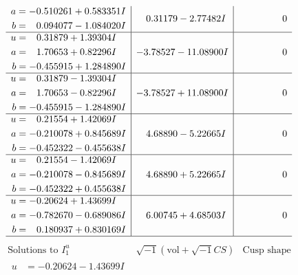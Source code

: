 \documentclass[1p]{elsarticle_modified}
\theoremstyle{definition}
\newcommand{\I}{\sqrt{-1}}
\begin{document}
$$\begin{array}{c|c|c}
\begin{aligned}
a &= -0.510261 + 0.583351 I \\
b &= \phantom{-}0.094077 - 1.084020 I\end{aligned}
 & \phantom{-}0.31179 - 2.77482 I & \phantom{-0.000000 } 0 \\ \hline\begin{aligned}
u &= \phantom{-}0.31879 + 1.39304 I \\
a &= \phantom{-}1.70653 + 0.82296 I \\
b &= -0.455915 + 1.284890 I\end{aligned}
 & -3.78527 - 11.08900 I & \phantom{-0.000000 } 0 \\ \hline\begin{aligned}
u &= \phantom{-}0.31879 - 1.39304 I \\
a &= \phantom{-}1.70653 - 0.82296 I \\
b &= -0.455915 - 1.284890 I\end{aligned}
 & -3.78527 + 11.08900 I & \phantom{-0.000000 } 0 \\ \hline\begin{aligned}
u &= \phantom{-}0.21554 + 1.42069 I \\
a &= -0.210078 + 0.845689 I \\
b &= -0.452322 - 0.455638 I\end{aligned}
 & \phantom{-}4.68890 - 5.22665 I & \phantom{-0.000000 } 0 \\ \hline\begin{aligned}
u &= \phantom{-}0.21554 - 1.42069 I \\
a &= -0.210078 - 0.845689 I \\
b &= -0.452322 + 0.455638 I\end{aligned}
 & \phantom{-}4.68890 + 5.22665 I & \phantom{-0.000000 } 0 \\ \hline\begin{aligned}
u &= -0.20624 + 1.43699 I \\
a &= -0.782670 - 0.689086 I \\
b &= \phantom{-}0.180937 + 0.830169 I\end{aligned}
 & \phantom{-}6.00745 + 4.68503 I & \phantom{-0.000000 } 0\\
 \hline 
 \end{array}$$\newpage$$\begin{array}{c|c|c}  
\text{Solutions to }I^u_{1}& \I (\text{vol} + \sqrt{-1}CS) & \text{Cusp shape}\\
 \hline 
\begin{aligned}
u &= -0.20624 - 1.43699 I \\

\end{aligned}
\end{array}$$
\end{document}

